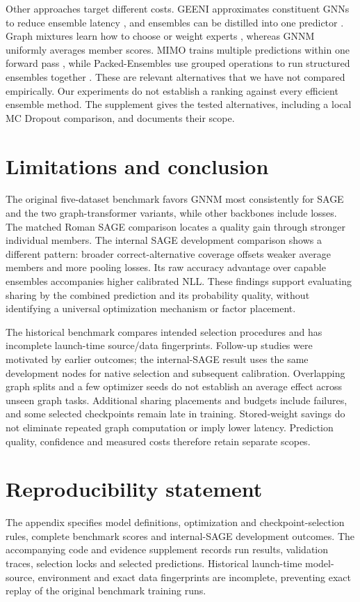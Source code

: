 \documentclass{article}
\begin{document}
Other approaches target different costs. GEENI approximates constituent GNNs to reduce ensemble latency \citep{nagarajan2022geeni}, and ensembles can be distilled into one predictor \citep{zhang2024e2gnn}. Graph mixtures learn how to choose or weight experts \citep{wang2023graph,deng2025mixture}, whereas GNNM uniformly averages member scores. MIMO trains multiple predictions within one forward pass \citep{havasi2021training}, while Packed-Ensembles use grouped operations to run structured ensembles together \citep{laurent2023packed}. These are relevant alternatives that we have not compared empirically. Our experiments do not establish a ranking against every efficient ensemble method. The supplement gives the tested alternatives, including a local MC Dropout comparison, and documents their scope.

\section{Limitations and conclusion}
The original five-dataset benchmark favors GNNM most consistently for SAGE and the two graph-transformer variants, while other backbones include losses. The matched Roman SAGE comparison locates a quality gain through stronger individual members. The internal SAGE development comparison shows a different pattern: broader correct-alternative coverage offsets weaker average members and more pooling losses. Its raw accuracy advantage over capable ensembles accompanies higher calibrated NLL. These findings support evaluating sharing by the combined prediction and its probability quality, without identifying a universal optimization mechanism or factor placement.

The historical benchmark compares intended selection procedures and has incomplete launch-time source/data fingerprints. Follow-up studies were motivated by earlier outcomes; the internal-SAGE result uses the same development nodes for native selection and subsequent calibration. Overlapping graph splits and a few optimizer seeds do not establish an average effect across unseen graph tasks. Additional sharing placements and budgets include failures, and some selected checkpoints remain late in training. Stored-weight savings do not eliminate repeated graph computation or imply lower latency. Prediction quality, confidence and measured costs therefore retain separate scopes.

\section*{Reproducibility statement}
The appendix specifies model definitions, optimization and checkpoint-selection rules, complete benchmark scores and internal-SAGE development outcomes. The accompanying code and evidence supplement records run results, validation traces, selection locks and selected predictions. Historical launch-time model-source, environment and exact data fingerprints are incomplete, preventing exact replay of the original benchmark training runs.
\end{document}
